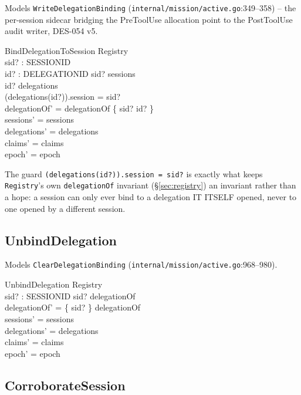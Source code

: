 \documentclass[a4paper,10pt,fleqn]{article}
\newcommand{\fpath}[1]{\texttt{#1}}
\newcommand{\field}[1]{\texttt{#1}}
\begin{document}
Models \field{WriteDelegationBinding}
(\fpath{internal/mission/active.go}:349--358) -- the per-session
sidecar bridging the PreToolUse allocation point to the PostToolUse
audit writer, DES-054 v5.

\begin{schema}{BindDelegationToSession}
\Delta Registry \\
sid? : SESSIONID \\
id? : DELEGATIONID
\where
sid? \in \dom sessions \\
id? \in \dom delegations \\
(delegations(id?)).session = sid? \\
delegationOf' = delegationOf \oplus \{ sid? \mapsto id? \} \\
sessions' = sessions \\
delegations' = delegations \\
claims' = claims \\
epoch' = epoch
\end{schema}

The guard \field{(delegations(id?)).session = sid?} is exactly what
keeps \field{Registry}'s own \field{delegationOf} invariant
(\S\ref{sec:registry}) an invariant rather than a hope: a session can
only ever bind to a delegation IT ITSELF opened, never to one opened by
a different session.

\subsection{UnbindDelegation}

Models \field{ClearDelegationBinding}
(\fpath{internal/mission/active.go}:968--980).

\begin{schema}{UnbindDelegation}
\Delta Registry \\
sid? : SESSIONID
\where
sid? \in \dom delegationOf \\
delegationOf' = \{ sid? \} \ndres delegationOf \\
sessions' = sessions \\
delegations' = delegations \\
claims' = claims \\
epoch' = epoch
\end{schema}

\subsection{CorroborateSession}
\label{sec:opcorroborate}
\end{document}
